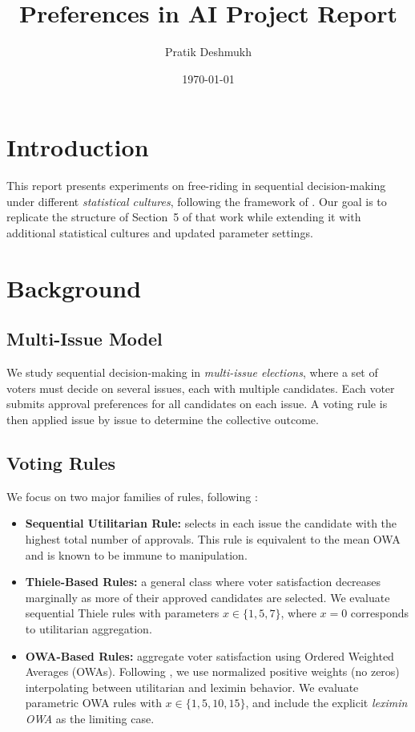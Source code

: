 \documentclass[11pt]{article}
\title{Preferences in AI Project Report}
\author{Pratik Deshmukh}
\date{\today}
\begin{document}
\maketitle

\section{Introduction}
This report presents experiments on free-riding in sequential decision-making
under different \emph{statistical cultures}, following the framework of
\cite{lackner2023freeriding}. Our goal is to replicate the structure of Section~5
of that work while extending it with additional statistical cultures and updated
parameter settings.

\section{Background}

\subsection{Multi-Issue Model}
We study sequential decision-making in \emph{multi-issue elections}, where a set
of voters must decide on several issues, each with multiple candidates. Each
voter submits approval preferences for all candidates on each issue. A voting
rule is then applied issue by issue to determine the collective outcome.

\subsection{Voting Rules}
We focus on two major families of rules, following \cite{lackner2023freeriding}:

\begin{itemize}
    \item \textbf{Sequential Utilitarian Rule:} selects in each issue the
    candidate with the highest total number of approvals. This rule is
    equivalent to the mean OWA and is known to be immune to manipulation.
    \item \textbf{Thiele-Based Rules:} a general class where voter satisfaction
    decreases marginally as more of their approved candidates are selected.
    We evaluate sequential Thiele rules with parameters $x \in \{1,5,7\}$,
    where $x=0$ corresponds to utilitarian aggregation.
    \item \textbf{OWA-Based Rules:} aggregate voter satisfaction using Ordered
    Weighted Averages (OWAs). Following \cite{lackner2023freeriding}, we use
    normalized positive weights (no zeros) interpolating between utilitarian
    and leximin behavior. We evaluate parametric OWA rules with
    $x \in \{1,5,10,15\}$, and include the explicit
    \emph{leximin OWA} as the limiting case.
\end{itemize}
\end{document}
